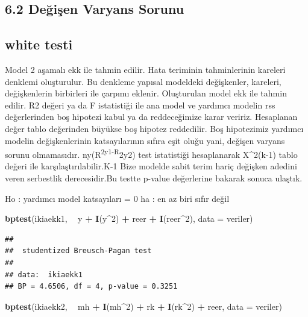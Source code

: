 \documentclass[]{article}
\newenvironment{Shaded}{\begin{snugshade}}{\end{snugshade}}
\newcommand{\KeywordTok}[1]{\textcolor[rgb]{0.13,0.29,0.53}{\textbf{#1}}}
\newcommand{\DataTypeTok}[1]{\textcolor[rgb]{0.13,0.29,0.53}{#1}}
\newcommand{\DecValTok}[1]{\textcolor[rgb]{0.00,0.00,0.81}{#1}}
\newcommand{\StringTok}[1]{\textcolor[rgb]{0.31,0.60,0.02}{#1}}
\newcommand{\OperatorTok}[1]{\textcolor[rgb]{0.81,0.36,0.00}{\textbf{#1}}}
\newcommand{\NormalTok}[1]{#1}
\begin{document}
\subsection{6.2 Değişen Varyans Sorunu}\label{degisen-varyans-sorunu}

\subsection{white testi}\label{white-testi}

Model 2 aşamalı ekk ile tahmin edilir. Hata teriminin tahminlerinin
kareleri denklemi oluşturulur. Bu denkleme yapısal modeldeki
değişkenler, kareleri, değişkenlerin birbirleri ile çarpımı eklenir.
Oluşturulan model ekk ile tahmin edilir. R2 değeri ya da F istatistiği
ile ana model ve yardımcı modelin rss değerlerinden boş hipotezi kabul
ya da reddeceğimize karar veririz. Hesaplanan değer tablo değerinden
büyükse boş hipotez reddedilir. Boş hipotezimiz yardımcı modelin
değişkenlerinin katsayılarının sıfıra eşit oluğu yani, değişen varyans
sorunu olmamasıdır. ny(R\textsuperscript{2y1-R}2y2) test istatistiği
hesaplanarak X\^{}2(k-1) tablo değeri ile karşılaştırılabilir.K-1 Bize
modelde sabit terim hariç değişken adedini veren serbestlik
derecesidir.Bu testte p-value değerlerine bakarak sonuca ulaştık.

Ho : yardımcı model katsayıları = 0 ha : en az biri sıfır değil

\begin{Shaded}
\begin{Highlighting}[]
\KeywordTok{bptest}\NormalTok{(ikiaekk1, }\OperatorTok{~}\StringTok{ }\NormalTok{y }\OperatorTok{+}\StringTok{ }\KeywordTok{I}\NormalTok{(y}\OperatorTok{^}\DecValTok{2}\NormalTok{) }\OperatorTok{+}\StringTok{ }\NormalTok{reer }\OperatorTok{+}\StringTok{ }\KeywordTok{I}\NormalTok{(reer}\OperatorTok{^}\DecValTok{2}\NormalTok{), }\DataTypeTok{data =}\NormalTok{ veriler)}
\end{Highlighting}
\end{Shaded}

\begin{verbatim}
## 
##  studentized Breusch-Pagan test
## 
## data:  ikiaekk1
## BP = 4.6506, df = 4, p-value = 0.3251
\end{verbatim}

\begin{Shaded}
\begin{Highlighting}[]
\KeywordTok{bptest}\NormalTok{(ikiaekk2, }\OperatorTok{~}\StringTok{ }\NormalTok{mh }\OperatorTok{+}\StringTok{ }\KeywordTok{I}\NormalTok{(mh}\OperatorTok{^}\DecValTok{2}\NormalTok{) }\OperatorTok{+}\StringTok{ }\NormalTok{rk }\OperatorTok{+}\StringTok{ }\KeywordTok{I}\NormalTok{(rk}\OperatorTok{^}\DecValTok{2}\NormalTok{) }\OperatorTok{+}\StringTok{ }\NormalTok{reer, }\DataTypeTok{data =}\NormalTok{ veriler)}
\end{Highlighting}
\end{Shaded}
\end{document}
